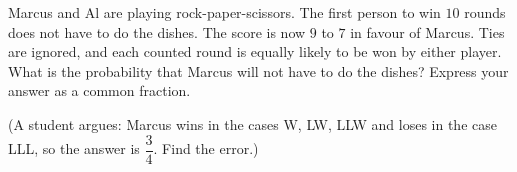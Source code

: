 Marcus and Al are playing rock-paper-scissors. The first person to win $10$ rounds does not have to do the dishes. The score is now $9$ to $7$ in favour of Marcus. Ties are ignored, and each counted round is equally likely to be won by either player. What is the probability that Marcus will not have to do the dishes? Express your answer as a common fraction.

(A student argues: Marcus wins in the cases W, LW, LLW and loses in the case LLL, so the answer is $\dfrac{3}{4}$. Find the error.)
